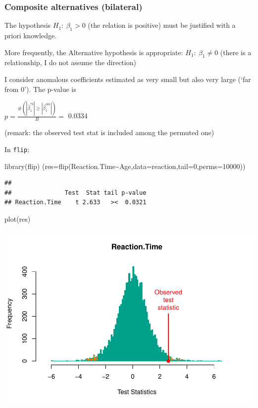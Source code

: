 \documentclass[
]{article}
\newenvironment{Shaded}{\begin{snugshade}}{\end{snugshade}}
\newcommand{\AttributeTok}[1]{\textcolor[rgb]{0.77,0.63,0.00}{#1}}
\newcommand{\DecValTok}[1]{\textcolor[rgb]{0.00,0.00,0.81}{#1}}
\newcommand{\FunctionTok}[1]{\textcolor[rgb]{0.00,0.00,0.00}{#1}}
\newcommand{\NormalTok}[1]{#1}
\newcommand{\SpecialCharTok}[1]{\textcolor[rgb]{0.00,0.00,0.00}{#1}}
\begin{document}
\hypertarget{composite-alternatives-bilateral}{%
\subsubsection{Composite alternatives
(bilateral)}\label{composite-alternatives-bilateral}}

The hypothesis \(H_1: \ \beta_1 >0\) (the relation is positive) must be
justified with a priori knowledge.

More frequently, the Alternative hypothesis is appropriate:
\(H_1: \ \beta_1 \neq 0\) (there is a relationship, I do not assume the
direction)

I consider anomalous coefficients estimated as very small but also very
large (`far from 0'). The p-value is

\(p=\frac{\#(|\hat{\beta}_1^{*b} | \geq|\hat{\beta}_1^{obs}|)}{B}=\)
0.0334

(remark: the observed test stat is included among the permuted one)

In \texttt{flip}:

\begin{Shaded}
\begin{Highlighting}[]
\FunctionTok{library}\NormalTok{(flip)}
\NormalTok{(}\AttributeTok{res=}\FunctionTok{flip}\NormalTok{(Reaction.Time}\SpecialCharTok{\textasciitilde{}}\NormalTok{Age,}\AttributeTok{data=}\NormalTok{reaction,}\AttributeTok{tail=}\DecValTok{0}\NormalTok{,}\AttributeTok{perms=}\DecValTok{10000}\NormalTok{))}
\end{Highlighting}
\end{Shaded}

\begin{verbatim}
## 
##               Test  Stat tail p-value
## Reaction.Time    t 2.633   ><  0.0321
\end{verbatim}

\begin{Shaded}
\begin{Highlighting}[]
\FunctionTok{plot}\NormalTok{(res)}
\end{Highlighting}
\end{Shaded}

\begin{center}\includegraphics{perm_files/figure-latex/unnamed-chunk-16-1} \end{center}
\end{document}
